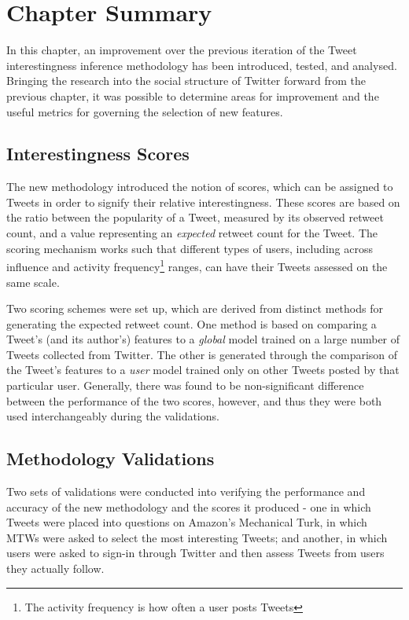 \section{Chapter Summary}
In this chapter, an improvement over the previous iteration of the Tweet interestingness inference methodology has been introduced, tested, and analysed. Bringing the research into the social structure of Twitter forward from the previous chapter, it was possible to determine areas for improvement and the useful metrics for governing the selection of new features.

\subsection{Interestingness Scores}
The new methodology introduced the notion of scores, which can be assigned to Tweets in order to signify their relative interestingness. These scores are based on the ratio between the popularity of a Tweet, measured by its observed retweet count, and a value representing an \textit{expected} retweet count for the Tweet. The scoring mechanism works such that different types of users, including across influence and activity frequency\footnote{The activity frequency is how often a user posts Tweets} ranges, can have their Tweets assessed on the same scale. 

Two scoring schemes were set up, which are derived from distinct methods for generating the expected retweet count. One method is based on comparing a Tweet's (and its author's) features to a \textit{global} model trained on a large number of Tweets collected from Twitter. The other is generated through the comparison of the Tweet's features to a \textit{user} model trained only on other Tweets posted by that particular user. Generally, there was found to be non-significant difference between the performance of the two scores, however, and thus they were both used interchangeably during the validations.

\subsection{Methodology Validations}
Two sets of validations were conducted into verifying the performance and accuracy of the new methodology and the scores it produced - one in which Tweets were placed into questions on Amazon's Mechanical Turk, in which MTWs were asked to select the most interesting Tweets; and another, in which users were asked to sign-in through Twitter and then assess Tweets from users they actually follow.

